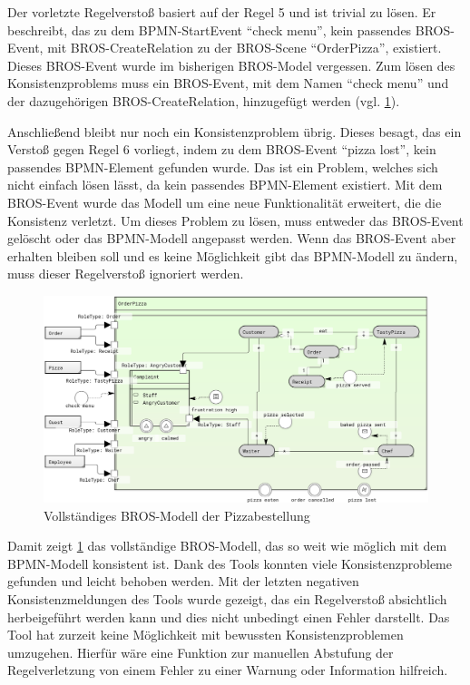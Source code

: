 Der vorletzte Regelverstoß basiert auf der Regel 5 und ist trivial zu lösen.
Er beschreibt, das zu dem BPMN-StartEvent ``check menu'', kein passendes BROS-Event, mit BROS-CreateRelation zu der BROS-Scene ``OrderPizza'', existiert.
Dieses BROS-Event wurde im bisherigen BROS-Model vergessen.
Zum lösen des Konsistenzproblems muss ein BROS-Event, mit dem Namen ``check menu'' und der dazugehörigen BROS-CreateRelation, hinzugefügt werden (vgl. \cref{fig:pizzaBros6}).

Anschließend bleibt nur noch ein Konsistenzproblem übrig.
Dieses besagt, das ein Verstoß gegen Regel 6 vorliegt, indem zu dem BROS-Event ``pizza lost'', kein passendes BPMN-Element gefunden wurde.
Das ist ein Problem, welches sich nicht einfach lösen lässt, da kein passendes BPMN-Element existiert.
Mit dem BROS-Event wurde das Modell um eine neue Funktionalität erweitert, die die Konsistenz verletzt.
Um dieses Problem zu lösen, muss entweder das BROS-Event gelöscht oder das BPMN-Modell angepasst werden.
Wenn das BROS-Event aber erhalten bleiben soll und es keine Möglichkeit gibt das BPMN-Modell zu ändern, muss dieser Regelverstoß ignoriert werden.

\begin{figure}
    \centering
    \includegraphics[width=\textwidth,keepaspectratio]{../images/example/bros-rule6.png}%
    \caption{Vollständiges BROS-Modell der Pizzabestellung}%
    \label{fig:pizzaBros6}
\end{figure}

Damit zeigt \cref{fig:pizzaBros6} das vollständige BROS-Modell, das so weit wie möglich mit dem BPMN-Modell konsistent ist.
Dank des Tools konnten viele Konsistenzprobleme gefunden und leicht behoben werden.
Mit der letzten negativen Konsistenzmeldungen des Tools wurde gezeigt, das ein Regelverstoß absichtlich herbeigeführt werden kann und dies nicht unbedingt einen Fehler darstellt.
Das Tool hat zurzeit keine Möglichkeit mit bewussten Konsistenzproblemen umzugehen.
Hierfür wäre eine Funktion zur manuellen Abstufung der Regelverletzung von einem Fehler zu einer Warnung oder Information hilfreich.

